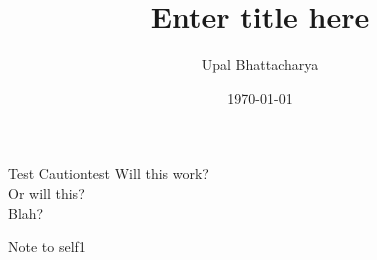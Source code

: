 \documentclass[a4paper]{article}
\author{Upal Bhattacharya}
\date{\today}
\title{Enter title here}
\begin{document}
\maketitle

\linenumbers

\begin{caution}{Test Caution}{test}
  Will this work? \\
  Or will this? \\
  Blah?
\end{caution}


\begin{upal}{Note to self}{1}
\end{upal}
\end{document}
